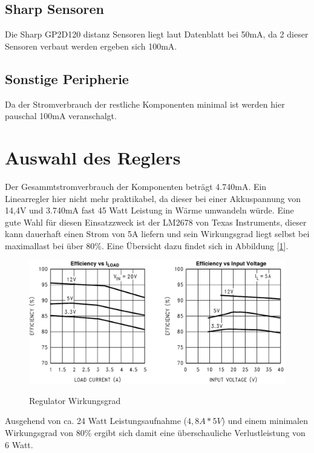 \subsection{Sharp Sensoren}
Die Sharp GP2D120 distanz Sensoren liegt laut Datenblatt \cite{ds-sharp-GP2D120} bei 50mA, da 2 dieser Sensoren verbaut werden ergeben sich 100mA.

\subsection{Sonstige Peripherie}
Da der Stromverbrauch der restliche Komponenten minimal ist werden hier pauschal 100mA veranschalgt.

\section{Auswahl des Reglers}
Der Gesammtstromverbrauch der Komponenten beträgt 4.740mA. Ein Linearregler hier nicht mehr praktikabel, da dieser bei einer Akkuspannung von 14,4V und 3.740mA fast 45 Watt Leistung in Wärme umwandeln würde.
Eine gute Wahl für diesen Einsatzzweck ist der LM2678 von Texas Instruments, dieser kann dauerhaft einen Strom von 5A liefern und sein Wirkungsgrad liegt selbst bei maximallast bei über 80\%.
Eine Übersicht dazu findet sich in Abbildung [\ref{fig:vreg}].
\begin{figure}[H]
\centering
\includegraphics[width=.8\textwidth]{vreg.png}\\
\caption{Regulator Wirkungsgrad}%
\label{fig:vreg}
\end{figure}
Ausgehend von ca. 24 Watt Leistungsaufnahme ($4,8A*5V$) und einem minimalen Wirkungsgrad von 80\%  ergibt sich damit eine überschauliche Verlustleistung von 6 Watt.

